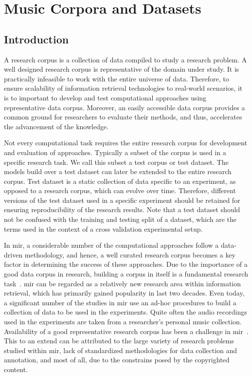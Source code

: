 
\chapter{Music Corpora and Datasets}
\label{chap:corpus_music_corpora_and_datasets}

\section{Introduction}
\label{sec:corpus_intro}

A research corpus is a collection of data compiled to study a research problem. A well designed research corpus is representative of the domain under study. It is practically infeasible to work with the entire universe of data. Therefore, to ensure scalability of information retrieval technologies to real-world scenarios, it is to important to develop and test computational approaches using representative data corpus. Moreover, an easily accessible data corpus provides a common ground for researchers to evaluate their methods, and thus, accelerates the advancement of the knowledge. 

Not every computational task requires the entire research corpus for development and evaluation of approaches. Typically a subset of the corpus is used in a specific research task. We call this subset a test corpus or test dataset. The models build over a test dataset can later be extended to the entire research corpus. Test dataset is a static collection of data specific to an experiment, as opposed to a research corpus, which can evolve over time. Therefore, different versions of the test dataset used in a specific experiment should be retained for ensuring reproducibility of the research results. Note that a test dataset should not be confused with the training and testing split of a dataset, which are the terms used in the context of a cross validation experimental setup.

In \gls{mir}, a considerable number of the computational approaches follow a data-driven methodology, and hence, a well curated research corpus becomes a key factor in determining the success of these approaches. Due to the importance of a good data corpus in research, building a corpus in itself is a fundamental research task~\citep{macmullen2003requirements}. \Gls{mir} can be regarded as a relatively new research area within information retrieval, which has primarily gained popularity in last two decades. Even today, a significant number of the studies in \gls{mir} use an ad-hoc procedures to build a collection of data to be used in the experiments. Quite often the audio recordings used in the experiments are taken from a researcher's personal music collection. Availability of a good representative research corpus has been a challenge in \gls{mir}~\citep{serra:14:corpus}. This to an extend can be attributed to the large variety of research problems studied within \gls{mir}, lack of standardized methodologies for data collection and annotation, and most of all, due to the constrains posed by the copyrighted content.

